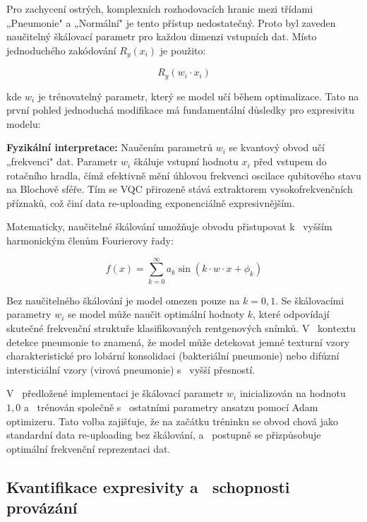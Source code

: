 \documentclass[12pt, a4paper]{report}
\begin{document}
Pro zachycení ostrých, komplexních rozhodovacích hranic mezi třídami „Pneumonie" a „Normální" je tento přístup nedostatečný. Proto byl zaveden naučitelný škálovací parametr pro každou dimenzi vstupních dat. Místo jednoduchého zakódování $R_y(x_i)$ je použito:

\begin{equation}
    R_y(w_i \cdot x_i)
\end{equation}

kde $w_i$ je trénovatelný parametr, který se model učí během optimalizace. Tato na první pohled jednoduchá modifikace má fundamentální důsledky pro expresivitu modelu:

\textbf{Fyzikální interpretace:} Naučením parametrů $w_i$ se kvantový obvod učí „frekvenci" dat. Parametr $w_i$ škáluje vstupní hodnotu $x_i$ před vstupem do rotačního hradla, čímž efektivně mění úhlovou frekvenci oscilace qubitového stavu na Blochově sféře. Tím se VQC přirozeně stává extraktorem vysokofrekvenčních příznaků, což činí data re-uploading exponenciálně expresivnějším.

Matematicky, naučitelné škálování umožňuje obvodu přistupovat k ~vyšším harmonickým členům Fourierovy řady:

\begin{equation}
    f(x) = \sum_{k=0}^{\infty} a_k \sin(k \cdot w \cdot x + \phi_k)
\end{equation}

Bez naučitelného škálování je model omezen pouze na $k = 0, 1$. Se škálovacími parametry $w_i$ se model může naučit optimální hodnoty $k$, které odpovídají skutečné frekvenční struktuře klasifikovaných rentgenových snímků. V ~kontextu detekce pneumonie to znamená, že model může detekovat jemné texturní vzory charakteristické pro lobární konsolidaci (bakteriální pneumonie) nebo difúzní intersticiální vzory (virová pneumonie) s ~vyšší přesností.

V ~předložené implementaci je škálovací parametr $w_i$ inicializován na hodnotu $1{,}0$ a ~trénován společně s ~ostatními parametry ansatzu pomocí Adam optimizeru. Tato volba zajišťuje, že na začátku tréninku se obvod chová jako standardní data re-uploading bez škálování, a ~postupně se přizpůsobuje optimální frekvenční reprezentaci dat.

\subsection{Kvantifikace expresivity a ~schopnosti provázání} \label{subsec:expressibility}
\end{document}

